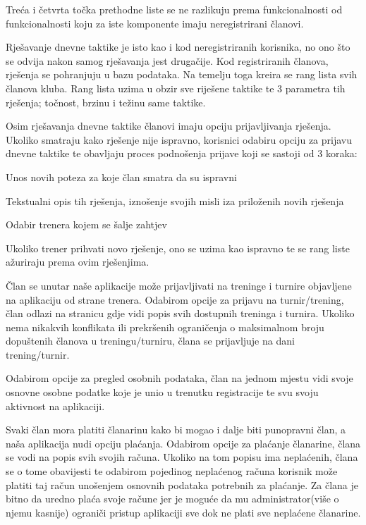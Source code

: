 \documentclass{article}
\begin{document}
		Treća i četvrta točka prethodne liste se ne razlikuju prema funkcionalnosti od funkcionalnosti koju za iste komponente imaju neregistrirani članovi. 
		
		Rješavanje dnevne taktike je isto kao i kod neregistriranih korisnika, no ono što se odvija nakon samog rješavanja jest drugačije. Kod registriranih članova, rješenja se pohranjuju u bazu podataka. Na temelju toga kreira se rang lista svih članova kluba. Rang lista uzima u obzir sve riješene taktike te 3 parametra tih rješenja; točnost, brzinu i težinu same taktike. 
		
		Osim rješavanja dnevne taktike članovi imaju opciju prijavljivanja rješenja. Ukoliko smatraju kako rješenje nije ispravno, korisnici odabiru opciju za prijavu dnevne taktike te obavljaju proces podnošenja prijave koji se sastoji od 3 koraka: 
		\begin{packed_enum}
			\item Unos novih poteza za koje član smatra da su ispravni 
			\item Tekstualni opis tih rješenja, iznošenje svojih misli iza priloženih novih rješenja 
			\item Odabir trenera kojem se šalje zahtjev 
		\end{packed_enum}
		Ukoliko trener prihvati novo rješenje, ono se uzima kao ispravno te se rang liste ažuriraju prema ovim rješenjima.  
		
		Član se unutar naše aplikacije može prijavljivati na treninge i turnire objavljene na aplikaciju od strane trenera. Odabirom opcije za prijavu na turnir/trening, član odlazi na stranicu gdje vidi popis svih dostupnih treninga i turnira. Ukoliko nema nikakvih konflikata ili prekršenih ograničenja o maksimalnom broju dopuštenih članova u treningu/turniru, člana se prijavljuje na dani trening/turnir. 
		
		Odabirom opcije za pregled osobnih podataka, član na jednom mjestu vidi svoje osnovne osobne podatke koje je unio u trenutku registracije te svu svoju aktivnost na aplikaciji. 
		
		Svaki član mora platiti članarinu kako bi mogao i dalje biti punopravni član, a naša aplikacija nudi opciju plaćanja. Odabirom opcije za plaćanje članarine, člana se vodi na popis svih svojih računa. Ukoliko na tom popisu ima neplaćenih, člana se o tome obavijesti te odabirom pojedinog neplaćenog računa korisnik može platiti taj račun unošenjem osnovnih podataka potrebnih za plaćanje. Za člana je bitno da uredno plaća svoje račune jer je moguće da mu administrator(više o njemu kasnije) ograniči pristup aplikaciji sve dok ne plati sve neplaćene članarine.\\ 
		
\end{document}
